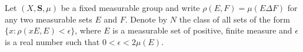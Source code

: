 Let $(X, \mathbf{S}, \mu)$ be a fixed measurable group and write $\rho(E, F) = \mu(E \Delta F)$ for any two measurable sets $E$ and $F$. Denote by $N$ the class of all sets of the form $\{x : \rho(xE, E) < \epsilon\}$, where $E$ is a measurable set of positive, finite measure and $\epsilon$ is a real number such that $0 < \epsilon < 2\mu(E)$.
